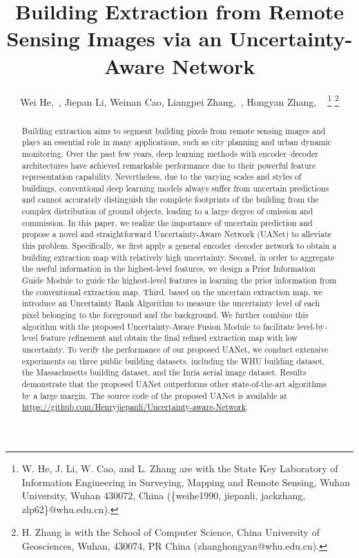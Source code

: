 \documentclass[lettersize,journal]{IEEEtran}
\begin{document}
\title{Building Extraction from Remote Sensing Images via an Uncertainty-Aware Network}

\author{Wei He,~, Jiepan Li, Weinan Cao, Liangpei Zhang,~, Hongyan Zhang, ~
\thanks{W. He, J. Li, W. Cao, and L. Zhang are with the State Key Laboratory of Information Engineering in Surveying, Mapping and Remote Sensing, Wuhan University, Wuhan 430072, China (\{weihe1990, jiepanli, jackzhang, zlp62\}@whu.edu.cn).}
\thanks{H. Zhang is with the School of Computer Science, China University of Geosciences, Wuhan, 430074, PR China (zhanghongyan@whu.edu.cn).}}





\maketitle

\begin{abstract}
Building extraction aims to segment building pixels from remote sensing images  and plays an essential role in many applications, such as city planning and urban dynamic monitoring. Over the past few years, deep learning methods with encoder–decoder architectures have achieved remarkable performance due to their powerful feature representation capability. Nevertheless, due to the varying scales and styles of buildings, conventional deep learning models always suffer from uncertain predictions and cannot accurately distinguish the complete footprints of the building from the complex distribution of ground objects, leading to a large degree of omission and commission. In this paper, we realize the importance of uncertain prediction and propose a novel and straightforward Uncertainty-Aware Network (UANet) to alleviate this problem. Specifically, we first apply a general encoder–decoder network to obtain a building extraction map with relatively high uncertainty. Second, in order to aggregate the useful information in the highest-level features, we design a Prior Information Guide Module to guide the highest-level features in learning the prior information from the conventional extraction map. Third, based on the uncertain extraction map, we introduce an Uncertainty Rank Algorithm to measure the uncertainty level of each pixel belonging to the foreground and the background. We further combine this algorithm with the proposed Uncertainty-Aware Fusion Module to facilitate level-by-level feature refinement and obtain the final refined extraction map with low uncertainty. To verify the performance of our proposed UANet, we conduct extensive experiments on three public building datasets, including the WHU building dataset, the Massachusetts building dataset, and the Inria aerial image dataset. Results demonstrate that the proposed UANet outperforms other state-of-the-art algorithms by a large margin.  The source code of the proposed UANet is available at \href{https://github.com/Henryjiepanli/Uncertainty-aware-Network}{https://github.com/Henryjiepanli/Uncertainty-aware-Network}.

\end{abstract}
\end{document}
